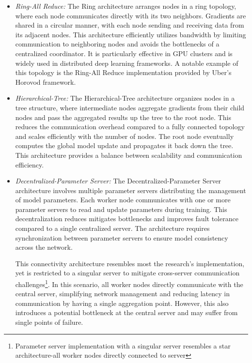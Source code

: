 \begin{itemize}
    \item \emph{Ring-All Reduce:} The Ring architecture arranges nodes in a ring topology, where each node communicates directly with its two neighbors.
          Gradients are shared in a circular manner, with each node sending and receiving data from its adjacent nodes. This architecture efficiently
          utilizes bandwidth by limiting communication to neighboring nodes and avoids the bottlenecks of a centralized coordinator. It is particularly effective
          in GPU clusters and is widely used in distributed deep learning frameworks. A notable example of this topology is the Ring-All Reduce
          implementation provided by Uber's Horovod framework\cite{sergeevHorovodFastEasy2018}.
    \item \emph{Hierarchical-Tree:} The Hierarchical-Tree architecture organizes nodes in a tree structure, where intermediate nodes aggregate gradients
          from their child nodes and pass the aggregated results up the tree to the root node. This reduces the communication overhead compared to a fully
          connected topology and scales efficiently with the number of nodes. The root node eventually computes the global model update and propagates it back
          down the tree. This architecture provides a balance between scalability and communication efficiency\cite{ReillyNetworkDistributed}.
    \item \emph{Decentralized-Parameter Server:} The Decentralized-Parameter Server architecture involves multiple parameter servers distributing the
          management of model parameters. Each worker node communicates with one or more parameter servers to read and update parameters during training. This
          decentralization reduces mitigates bottlenecks and improves fault tolerance compared to a single centralized server. The architecture requires synchronization
          between parameter servers to ensure model consistency across the network.

          This connectivity architecture resembles most the research's implementation,
          yet is restricted to a singular server to mitigate cross-server communication challenges\footnote{Parameter server implementation with a singular server
              resembles a star architecture-all worker nodes directly connected to server}.
          In this scenario, all worker nodes directly communicate with the central server, simplifying network management and reducing latency in communication
          by having a single aggregation point. However, this also introduces a potential bottleneck at the central server and may suffer from single points of failure.
\end{itemize}

